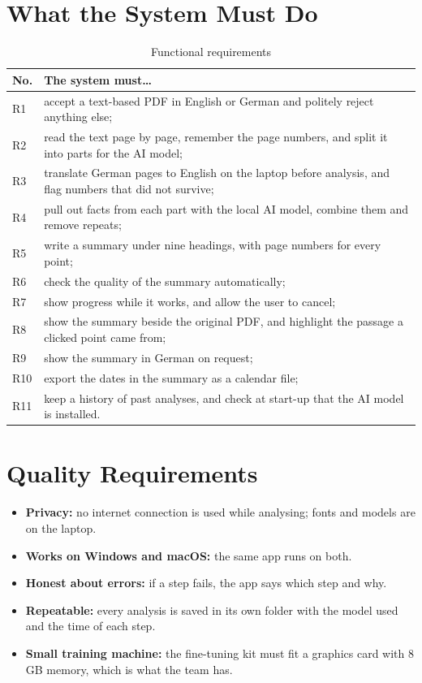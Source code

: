 \documentclass[11pt,a4paper,oneside]{report}
\begin{document}
\section{What the System Must Do}
\begin{table}[H]
\centering
\caption{Functional requirements}
\label{tab:fr}
\small
\begin{tabularx}{\linewidth}{@{}p{1.1cm}L@{}}
\toprule
No. & The system must\ldots\\
\midrule
R1 & accept a text-based PDF in English or German and politely reject anything else;\\
R2 & read the text page by page, remember the page numbers, and split it into parts for the AI model;\\
R3 & translate German pages to English on the laptop before analysis, and flag numbers that did not survive;\\
R4 & pull out facts from each part with the local AI model, combine them and remove repeats;\\
R5 & write a summary under nine headings, with page numbers for every point;\\
R6 & check the quality of the summary automatically;\\
R7 & show progress while it works, and allow the user to cancel;\\
R8 & show the summary beside the original PDF, and highlight the passage a clicked point came from;\\
R9 & show the summary in German on request;\\
R10 & export the dates in the summary as a calendar file;\\
R11 & keep a history of past analyses, and check at start-up that the AI model is installed.\\
\bottomrule
\end{tabularx}
\end{table}

\section{Quality Requirements}
\begin{itemize}
\item \textbf{Privacy:} no internet connection is used while analysing; fonts and models are on the laptop.
\item \textbf{Works on Windows and macOS:} the same app runs on both.
\item \textbf{Honest about errors:} if a step fails, the app says which step and why.
\item \textbf{Repeatable:} every analysis is saved in its own folder with the model used and the time of each step.
\item \textbf{Small training machine:} the fine-tuning kit must fit a graphics card with 8 GB memory, which is what the team has.
\end{itemize}
\end{document}
